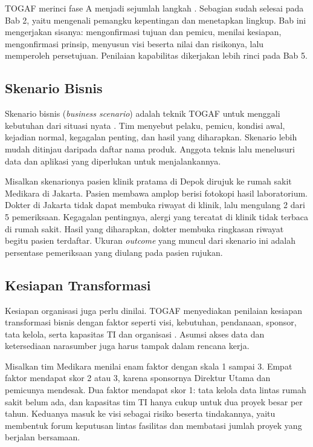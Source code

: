 TOGAF merinci fase A menjadi sejumlah langkah \cite{togaf10}. Sebagian sudah selesai pada
Bab 2, yaitu mengenali pemangku kepentingan dan menetapkan lingkup. Bab ini mengerjakan
sisanya: mengonfirmasi tujuan dan pemicu, menilai kesiapan, mengonfirmasi prinsip, menyusun
visi beserta nilai dan risikonya, lalu memperoleh persetujuan. Penilaian kapabilitas
dikerjakan lebih rinci pada Bab 5.

\subsection*{Skenario Bisnis}

Skenario bisnis (\textit{business scenario}) adalah teknik TOGAF untuk menggali
kebutuhan dari situasi nyata \cite{togaf10}. Tim menyebut pelaku, pemicu, kondisi
awal, kejadian normal, kegagalan penting, dan hasil yang diharapkan. Skenario
lebih mudah ditinjau daripada daftar nama produk. Anggota teknis lalu menelusuri
data dan aplikasi yang diperlukan untuk menjalankannya.

Misalkan skenarionya pasien klinik pratama di Depok dirujuk ke rumah sakit
Medikara di Jakarta. Pasien membawa amplop berisi fotokopi hasil laboratorium.
Dokter di Jakarta tidak dapat membuka riwayat di klinik, lalu mengulang 2 dari 5
pemeriksaan. Kegagalan pentingnya, alergi yang tercatat di klinik tidak terbaca
di rumah sakit. Hasil yang diharapkan, dokter membuka ringkasan riwayat begitu
pasien terdaftar. Ukuran \textit{outcome} yang muncul dari skenario ini adalah
persentase pemeriksaan yang diulang pada pasien rujukan.

\subsection*{Kesiapan Transformasi}

Kesiapan organisasi juga perlu dinilai. TOGAF menyediakan penilaian kesiapan
transformasi bisnis dengan faktor seperti visi, kebutuhan, pendanaan, sponsor,
tata kelola, serta kapasitas TI dan organisasi \cite{togaf10}. Asumsi akses data dan
ketersediaan narasumber juga harus tampak dalam rencana kerja.

Misalkan tim Medikara menilai enam faktor dengan skala 1 sampai 3. Empat faktor
mendapat skor 2 atau 3, karena sponsornya Direktur Utama dan pemicunya mendesak.
Dua faktor mendapat skor 1: tata kelola data lintas rumah sakit belum ada, dan
kapasitas tim TI hanya cukup untuk dua proyek besar per tahun. Keduanya masuk ke visi
sebagai risiko beserta tindakannya, yaitu membentuk forum keputusan lintas fasilitas
dan membatasi jumlah proyek yang berjalan bersamaan.

